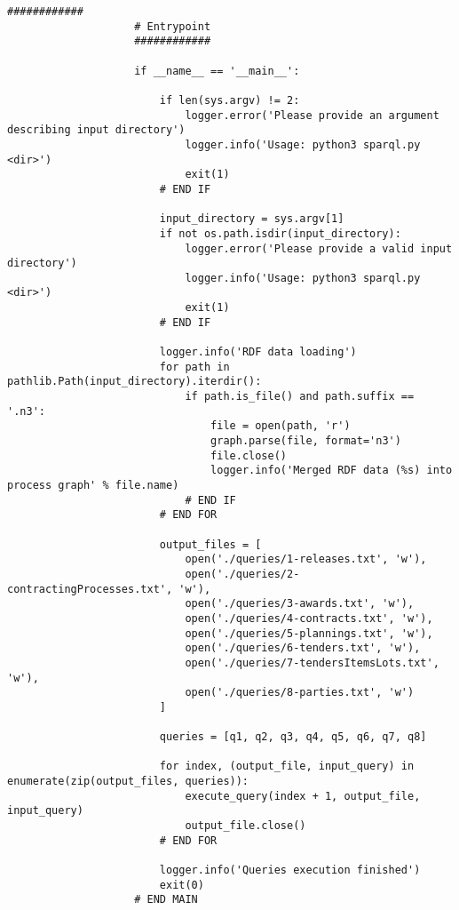            \begin{minipage}{\linewidth}
                \begin{lstlisting}[language=lPython]
                    ############
                    # Entrypoint
                    ############
                    
                    if __name__ == '__main__':
                    
                        if len(sys.argv) != 2:
                            logger.error('Please provide an argument describing input directory')
                            logger.info('Usage: python3 sparql.py <dir>')
                            exit(1)
                        # END IF
                    
                        input_directory = sys.argv[1]
                        if not os.path.isdir(input_directory):
                            logger.error('Please provide a valid input directory')
                            logger.info('Usage: python3 sparql.py <dir>')
                            exit(1)
                        # END IF
                    
                        logger.info('RDF data loading')
                        for path in pathlib.Path(input_directory).iterdir():
                            if path.is_file() and path.suffix == '.n3':
                                file = open(path, 'r')
                                graph.parse(file, format='n3')
                                file.close()
                                logger.info('Merged RDF data (%s) into process graph' % file.name)
                            # END IF
                        # END FOR
                    
                        output_files = [
                            open('./queries/1-releases.txt', 'w'),
                            open('./queries/2-contractingProcesses.txt', 'w'),
                            open('./queries/3-awards.txt', 'w'),
                            open('./queries/4-contracts.txt', 'w'),
                            open('./queries/5-plannings.txt', 'w'),
                            open('./queries/6-tenders.txt', 'w'),
                            open('./queries/7-tendersItemsLots.txt', 'w'),
                            open('./queries/8-parties.txt', 'w')
                        ]
                    
                        queries = [q1, q2, q3, q4, q5, q6, q7, q8]
                    
                        for index, (output_file, input_query) in enumerate(zip(output_files, queries)):
                            execute_query(index + 1, output_file, input_query)
                            output_file.close()
                        # END FOR
                        
                        logger.info('Queries execution finished')
                        exit(0)
                    # END MAIN
                \end{lstlisting}
            \end{minipage}
